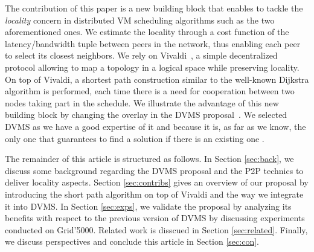 The contribution of this paper is a new building block  that enables to tackle
the \emph{locality} concern in distributed VM scheduling algorithms such as the two aforementioned ones. 
We estimate the locality through a cost function of the latency/bandwidth tuple
between peers in the network, thus enabling each peer to select its closest
neighbors. We rely on Vivaldi~\cite{refquivabien}, a simple decentralized
protocol allowing to map a topology in a logical space while preserving
locality.  On top of Vivaldi, a shortest path construction similar to the
well-known Dijkstra algorithm is performed, each time there is a need for
cooperation between two nodes taking part in the schedule. 
We illustrate the advantage of this new building block by  changing the overlay in the
DVMS proposal~\cite{quesnel:2012}.  We selected DVMS  as we have a good
expertise of it and because it is, as far as we know, the only one that
guarantees to find a solution if there is an existing one \cite{quesnel:ispa2103}.
                                                   
The remainder of this article is structured as follows. In Section \ref{sec:back}, we
discuss some background regarding the DVMS proposal and the P2P technics to
deliver locality aspects.  Section \ref{sec:contribs} gives an overview of our proposal by
introducing the short path algorithm on top of  Vivaldi and the way we
integrate it into DVMS.  In Section \ref{sec:exps}, we validate the proposal by analyzing
its benefits with respect to the previous version of DVMS by discussing experiments conducted on Grid'5000. Related work is
disscued in Section \ref{sec:related}. Finally, we discuss perspectives and conclude this
article in Section \ref{sec:con}. 

